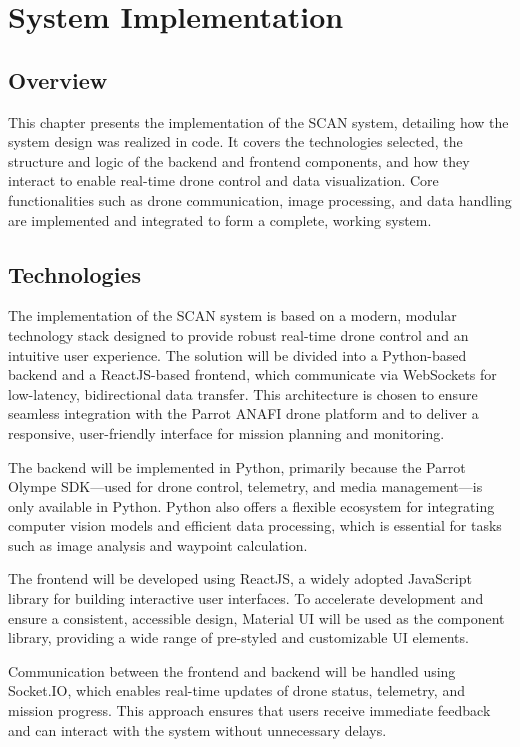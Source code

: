 \chapter{System Implementation}

\section{Overview}
This chapter presents the implementation of the SCAN system, detailing how the system design was realized in code. It covers the technologies selected, the structure and logic of the backend and frontend components, and how they interact to enable real-time drone control and data visualization. Core functionalities such as drone communication, image processing, and data handling are implemented and integrated to form a complete, working system.

\section{Technologies}
The implementation of the SCAN system is based on a modern, modular technology stack designed to provide robust real-time drone control and an intuitive user experience. The solution will be divided into a Python-based backend and a ReactJS-based frontend, which communicate via WebSockets for low-latency, bidirectional data transfer. This architecture is chosen to ensure seamless integration with the Parrot ANAFI drone platform and to deliver a responsive, user-friendly interface for mission planning and monitoring.

The backend will be implemented in Python, primarily because the Parrot Olympe SDK—used for drone control, telemetry, and media management—is only available in Python. Python also offers a flexible ecosystem for integrating computer vision models and efficient data processing, which is essential for tasks such as image analysis and waypoint calculation.

The frontend will be developed using ReactJS, a widely adopted JavaScript library for building interactive user interfaces. To accelerate development and ensure a consistent, accessible design, Material UI will be used as the component library, providing a wide range of pre-styled and customizable UI elements.

Communication between the frontend and backend will be handled using Socket.IO, which enables real-time updates of drone status, telemetry, and mission progress. This approach ensures that users receive immediate feedback and can interact with the system without unnecessary delays.

